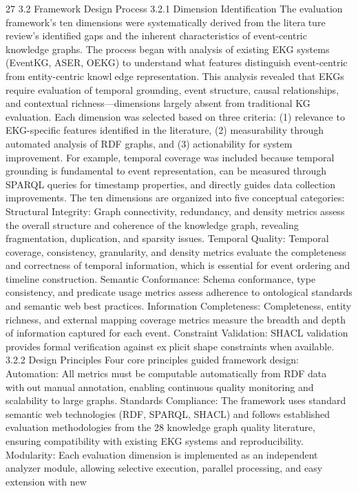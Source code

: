 27
3.2 Framework Design Process
3.2.1 Dimension Identification
The evaluation framework’s ten dimensions were systematically derived from the literature review’s identified gaps and the inherent characteristics of event-centric knowledge
graphs. The process began with analysis of existing EKG systems (EventKG, ASER,
OEKG) to understand what features distinguish event-centric from entity-centric knowledge representation. This analysis revealed that EKGs require evaluation of temporal
grounding, event structure, causal relationships, and contextual richness—dimensions
largely absent from traditional KG evaluation.
Each dimension was selected based on three criteria: (1) relevance to EKG-specific
features identified in the literature, (2) measurability through automated analysis of RDF
graphs, and (3) actionability for system improvement. For example, temporal coverage
was included because temporal grounding is fundamental to event representation, can be
measured through SPARQL queries for timestamp properties, and directly guides data
collection improvements.
The ten dimensions are organized into five conceptual categories:
Structural Integrity: Graph connectivity, redundancy, and density metrics assess
the overall structure and coherence of the knowledge graph, revealing fragmentation,
duplication, and sparsity issues.
Temporal Quality: Temporal coverage, consistency, granularity, and density metrics
evaluate the completeness and correctness of temporal information, which is essential for
event ordering and timeline construction.
Semantic Conformance: Schema conformance, type consistency, and predicate
usage metrics assess adherence to ontological standards and semantic web best practices.
Information Completeness: Completeness, entity richness, and external mapping
coverage metrics measure the breadth and depth of information captured for each event.
Constraint Validation: SHACL validation provides formal verification against explicit shape constraints when available.
3.2.2 Design Principles
Four core principles guided framework design:
Automation: All metrics must be computable automatically from RDF data without manual annotation, enabling continuous quality monitoring and scalability to large
graphs.
Standards Compliance: The framework uses standard semantic web technologies
(RDF, SPARQL, SHACL) and follows established evaluation methodologies from the
28
knowledge graph quality literature, ensuring compatibility with existing EKG systems
and reproducibility.
Modularity: Each evaluation dimension is implemented as an independent analyzer
module, allowing selective execution, parallel processing, and easy extension with new
